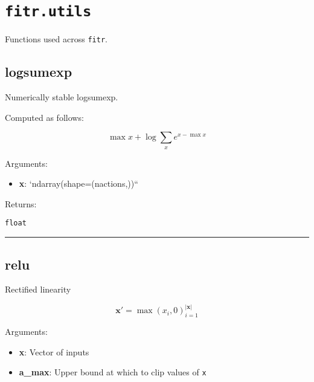 \hypertarget{fitr.utils}{%
\section{\texorpdfstring{\texttt{fitr.utils}}{fitr.utils}}\label{fitr.utils}}

Functions used across \texttt{fitr}.

\hypertarget{logsumexp}{%
\subsection{logsumexp}\label{logsumexp}}

\begin{Shaded}
\begin{Highlighting}[]
\end{Highlighting}
\end{Shaded}

Numerically stable logsumexp.

Computed as follows:

\[
\max x + \log \sum_x e^{x - \max x}
\]

Arguments:

\begin{itemize}
\tightlist
\item
  \textbf{x}: `ndarray(shape=(nactions,))``
\end{itemize}

Returns:

\texttt{float}

\begin{center}\rule{0.5\linewidth}{\linethickness}\end{center}

\hypertarget{relu}{%
\subsection{relu}\label{relu}}

\begin{Shaded}
\begin{Highlighting}[]
\OperatorTok{=}\NormalTok{)}
\end{Highlighting}
\end{Shaded}

Rectified linearity

\[
\mathbf x' = \max (x_i, 0)_{i=1}^{|\mathbf x|}
\]

Arguments:

\begin{itemize}
\tightlist
\item
  \textbf{x}: Vector of inputs
\item
  \textbf{a\_max}: Upper bound at which to clip values of \texttt{x}
\end{itemize}

